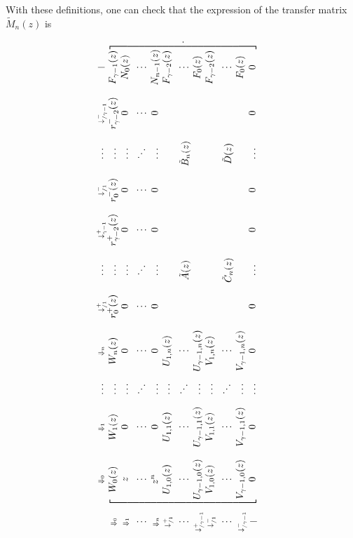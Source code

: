 \documentclass{article}
\begin{document}
With these definitions, one can check that the expression of the transfer
matrix $\tilde{M}_n(z)$ is

\begin{equation*}
\rotatebox{90}{$
\begin{blockarray}{cccccccccccc}
   & \scriptstyle{\Downarrow_0} & \scriptstyle{\Downarrow_1} &
   \ldots & \scriptstyle{\Downarrow_n} &
    \scriptstyle{\downarrow_{/1}^+} & 
    \ldots & \scriptstyle{\downarrow_{\gamma-1}^+} &
    \scriptstyle{\downarrow_{/1}^-} & \ldots &
    \scriptstyle{\downarrow_{/\gamma-1}^-} & \scriptstyle{|} \\
\begin{block}{c[ccccccccccc]}
\scriptstyle{\Downarrow_0} & W_0(z) & W_1(z) & \ldots & W_n(z) &
    r_0^+(z) & \ldots & r_{\gamma-2}^+(z) & r_0^-(z) & \ldots &
    r_{\gamma-2}^-(z) & F_{\gamma-1}(z) \\
\scriptstyle{\Downarrow_1} & z  & 0 & \ldots &
  0 & 0 & \ldots & 0 & 0 & \ldots & 0 & N_0(z) \\
\vdots & \vdots & \vdots & \ddots & \vdots & \vdots & \ddots &
  \vdots & \vdots & \ddots & \vdots & \vdots \\
\scriptstyle{\Downarrow_n} & z^n & 0 & \ldots &
  0 & 0 & \ldots & 0 & 0 & \ldots & 0 & N_{n-1}(z) \\
\scriptstyle{\downarrow_{/1}^+} & U_{1,0}(z) & U_{1,1}(z) & \ldots &
  U_{1,n}(z) & & & & & & & F_{\gamma-2}(z) \\
\vdots & \vdots & \vdots & \ddots & \vdots & & \tilde{A}(z) & & &
  \tilde{B}_n(z) & & \vdots \\
\scriptstyle{\downarrow_{/\gamma-1}^+} & U_{\gamma-1,0}(z) &
  U_{\gamma-1,1}(z) & \ldots & U_{\gamma-1,n}(z) & & & & & & & F_0(z) \\
\scriptstyle{\downarrow_{/1}^-} & V_{1,0}(z) & V_{1,1}(z) & \ldots &
    V_{1,n}(z) & & & & & & & F_{\gamma-2}(z) \\
\vdots & \vdots & \vdots & \ddots & \vdots & & \tilde{C}_n(z) &
  & & \tilde{D}(z) & & \vdots \\
\scriptstyle{\downarrow_{/\gamma-1}^-} & V_{\gamma-1,0}(z) &
    V_{\gamma-1,1}(z) & \ldots & V_{\gamma-1,n}(z) & & &
    & & & & F_0(z) \\
\scriptstyle{|} & 0 & 0 & \ldots & 0 & 0 & \ldots & 0 & 0 &
  \ldots & 0 & 0 \\
\end{block}
\end{blockarray}.
$}
\end{equation*}
\end{document}
